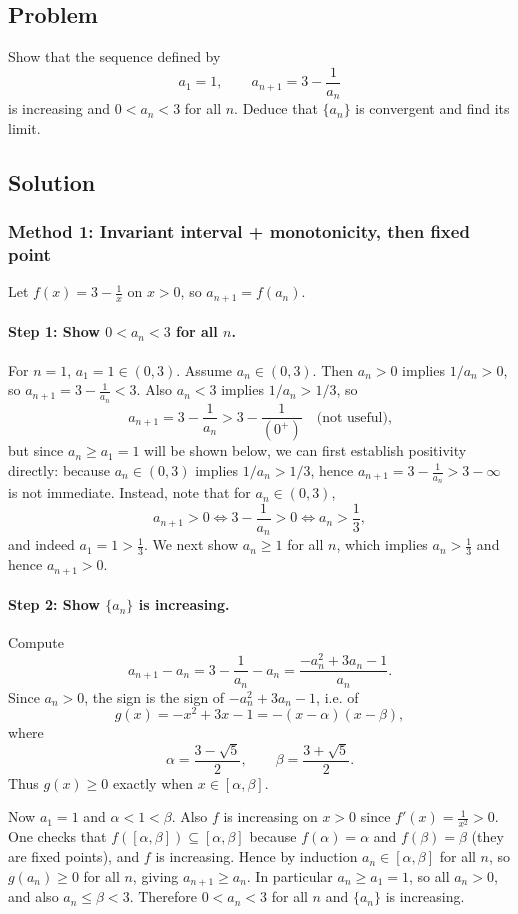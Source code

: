 \documentclass[12pt]{article}
\begin{document}
\subsection*{Problem}
Show that the sequence defined by
\[
a_1 = 1,\qquad a_{n+1} = 3 - \frac{1}{a_n}
\]
is increasing and \(0<a_n<3\) for all \(n\). Deduce that \(\{a_n\}\) is convergent and find its limit.

\subsection*{Solution}

\subsubsection*{Method 1: Invariant interval + monotonicity, then fixed point}

Let \(f(x)=3-\frac{1}{x}\) on \(x>0\), so \(a_{n+1}=f(a_n)\).

\paragraph{Step 1: Show \(0<a_n<3\) for all \(n\).}
For \(n=1\), \(a_1=1\in(0,3)\). Assume \(a_n\in(0,3)\). Then \(a_n>0\) implies \(1/a_n>0\), so \(a_{n+1}=3-\frac{1}{a_n}<3\). Also \(a_n<3\) implies \(1/a_n>1/3\), so
\[
a_{n+1}=3-\frac{1}{a_n} > 3-\frac{1}{(0^+)}\quad\text{(not useful),}
\]
but since \(a_n\ge a_1=1\) will be shown below, we can first establish positivity directly:
because \(a_n\in(0,3)\) implies \(1/a_n>1/3\), hence \(a_{n+1}=3-\frac{1}{a_n}>3-\infty\) is not immediate. Instead, note that for \(a_n\in(0,3)\),
\[
a_{n+1}>0 \iff 3-\frac{1}{a_n}>0 \iff a_n>\frac{1}{3},
\]
and indeed \(a_1=1>\frac{1}{3}\). We next show \(a_n\ge 1\) for all \(n\), which implies \(a_n>\frac{1}{3}\) and hence \(a_{n+1}>0\).

\paragraph{Step 2: Show \(\{a_n\}\) is increasing.}
Compute
\[
a_{n+1}-a_n = 3-\frac{1}{a_n}-a_n = \frac{-a_n^2+3a_n-1}{a_n}.
\]
Since \(a_n>0\), the sign is the sign of \(-a_n^2+3a_n-1\), i.e. of
\[
g(x)=-x^2+3x-1 = -(x-\alpha)(x-\beta),
\]
where
\[
\alpha=\frac{3-\sqrt{5}}{2},\qquad \beta=\frac{3+\sqrt{5}}{2}.
\]
Thus \(g(x)\ge 0\) exactly when \(x\in[\alpha,\beta]\).

Now \(a_1=1\) and \(\alpha<1<\beta\). Also \(f\) is increasing on \(x>0\) since \(f'(x)=\frac{1}{x^2}>0\). One checks that \(f([\alpha,\beta])\subseteq [\alpha,\beta]\) because \(f(\alpha)=\alpha\) and \(f(\beta)=\beta\) (they are fixed points), and \(f\) is increasing. Hence by induction \(a_n\in[\alpha,\beta]\) for all \(n\), so \(g(a_n)\ge 0\) for all \(n\), giving \(a_{n+1}\ge a_n\). In particular \(a_n\ge a_1=1\), so all \(a_n>0\), and also \(a_n\le \beta<3\). Therefore \(0<a_n<3\) for all \(n\) and \(\{a_n\}\) is increasing.
\end{document}
